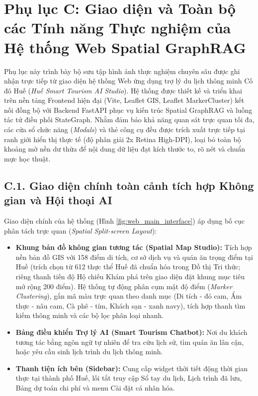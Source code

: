 \vspace{0.8cm}

\clearpage
\section*{Phụ lục C: Giao diện và Toàn bộ các Tính năng Thực nghiệm của Hệ thống Web Spatial GraphRAG}
{}

Phụ lục này trình bày bộ sưu tập hình ảnh thực nghiệm chuyên sâu được ghi nhận trực tiếp từ giao diện hệ thống Web ứng dụng trợ lý du lịch thông minh Cố đô Huế (\textit{Huế Smart Tourism AI Studio}). Hệ thống được thiết kế và triển khai trên nền tảng Frontend hiện đại (Vite, Leaflet GIS, Leaflet MarkerCluster) kết nối đồng bộ với Backend FastAPI phục vụ kiến trúc Spatial GraphRAG và luồng tác tử điều phối StateGraph. Nhằm đảm bảo khả năng quan sát trực quan tối đa, các cửa sổ chức năng (\textit{Modals}) và thẻ công cụ đều được trích xuất trực tiếp tại ranh giới hiển thị thực tế (độ phân giải 2x Retina High-DPI), loại bỏ toàn bộ khoảng mờ nền dư thừa để nội dung dữ liệu đạt kích thước to, rõ nét và chuẩn mực học thuật.

\renewcommand{\thefigure}{C.\arabic{figure}}
\setcounter{figure}{0}

\subsection*{C.1. Giao diện chính toàn cảnh tích hợp Không gian và Hội thoại AI}

Giao diện chính của hệ thống (Hình \ref{fig:web_main_interface}) áp dụng bố cục phân tách trực quan (\textit{Spatial Split-screen Layout}):
\begin{itemize}
    \item \textbf{Khung bản đồ không gian tương tác (Spatial Map Studio):} Tích hợp nền bản đồ GIS với 158 điểm di tích, cơ sở dịch vụ và quán ăn trọng điểm tại Huế (trích chọn từ 612 thực thể Huế đã chuẩn hóa trong Đồ thị Tri thức; riêng thanh tiến độ Hộ chiếu Khám phá trên giao diện đặt khung mục tiêu mở rộng 200 điểm). Hệ thống tự động phân cụm mật độ điểm (\textit{Marker Clustering}), gắn mã màu trực quan theo danh mục (Di tích - đỏ cam, Ẩm thực - nâu cam, Cà phê - tím, Khách sạn - xanh navy), tích hợp thanh tìm kiếm thông minh và các bộ lọc phân loại nhanh.
    \item \textbf{Bảng điều khiển Trợ lý AI (Smart Tourism Chatbot):} Nơi du khách tương tác bằng ngôn ngữ tự nhiên để tra cứu lịch sử, tìm quán ăn lân cận, hoặc yêu cầu sinh lịch trình du lịch thông minh.
    \item \textbf{Thanh tiện ích bên (Sidebar):} Cung cấp widget thời tiết động thời gian thực tại thành phố Huế, lối tắt truy cập Sổ tay du lịch, Lịch trình đã lưu, Bảng dự toán chi phí và menu Cài đặt cá nhân hóa.
\end{itemize}

